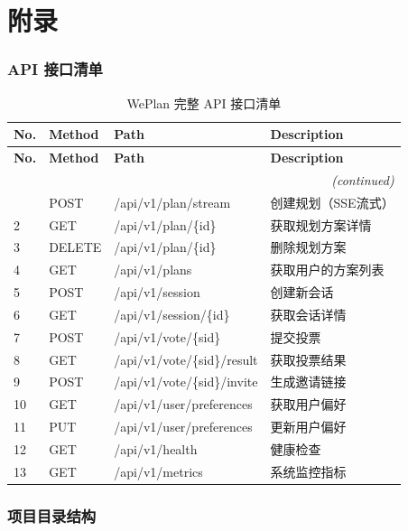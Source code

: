 \documentclass[12pt,a4paper]{ctexart}
\begin{document}
\newpage

\appendix
\part*{附录}

\section{API 接口清单}

\begin{longtable}{p{1cm} p{2cm} p{4cm} p{5cm}}
\caption{WePlan 完整 API 接口清单} \label{tab:api-list} \\
\toprule
\textbf{No.} & \textbf{Method} & \textbf{Path} & \textbf{Description} \\
\midrule
\endfirsthead
\toprule
\textbf{No.} & \textbf{Method} & \textbf{Path} & \textbf{Description} \\
\midrule
\endhead
\midrule
\multicolumn{4}{r}{\textit{(continued)}} \\
\endfoot
\bottomrule
\endlastfoot
1 & POST & /api/v1/plan/stream & 创建规划（SSE流式） \\
2 & GET & /api/v1/plan/\{id\} & 获取规划方案详情 \\
3 & DELETE & /api/v1/plan/\{id\} & 删除规划方案 \\
4 & GET & /api/v1/plans & 获取用户的方案列表 \\
5 & POST & /api/v1/session & 创建新会话 \\
6 & GET & /api/v1/session/\{id\} & 获取会话详情 \\
7 & POST & /api/v1/vote/\{sid\} & 提交投票 \\
8 & GET & /api/v1/vote/\{sid\}/result & 获取投票结果 \\
9 & POST & /api/v1/vote/\{sid\}/invite & 生成邀请链接 \\
10 & GET & /api/v1/user/preferences & 获取用户偏好 \\
11 & PUT & /api/v1/user/preferences & 更新用户偏好 \\
12 & GET & /api/v1/health & 健康检查 \\
13 & GET & /api/v1/metrics & 系统监控指标 \\
\end{longtable}

\section{项目目录结构}
\end{document}

